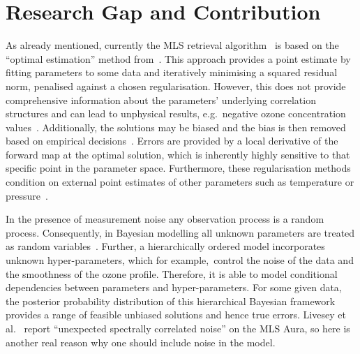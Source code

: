 \section{Research Gap and Contribution}

As already mentioned, currently the MLS retrieval algorithm~\cite{livesey2006retrieval} is based on the ``optimal estimation'' method from~\cite{rodgers1976retrieval}.
This approach provides a point estimate by fitting parameters to some data and iteratively minimising a squared residual norm, penalised against a chosen regularisation.
However, this does not provide comprehensive information about the parameters' underlying correlation structures and can lead to unphysical results, e.g.~negative ozone concentration values~\cite{MLSdata}.
Additionally, the solutions may be biased and the bias is then removed based on empirical decisions~\cite{livesey2008ozonecarbonmono, Froidevaux2008snrozone}.
Errors are provided by a local derivative of the forward map at the optimal solution, which is inherently highly sensitive to that specific point in the parameter space.
Furthermore, these regularisation methods condition on external point estimates of other parameters such as temperature or pressure~\cite{livesey2006retrieval}.

In the presence of measurement noise any observation process is a random process.
Consequently, in Bayesian modelling all unknown parameters are treated as random variables~\cite{kaipio2005statinv}.
Further, a hierarchically ordered model incorporates unknown hyper-parameters, which for example,~control the noise of the data and the smoothness of the ozone profile.
Therefore, it is able to model conditional dependencies between parameters and hyper-parameters.
For some given data, the posterior probability distribution of this hierarchical Bayesian framework provides a range of feasible unbiased solutions and hence true errors.
Livesey et al.~\cite{livesey2006retrieval} report ``unexpected spectrally correlated noise'' on the MLS Aura, so here is another real reason why one should include noise in the model.


